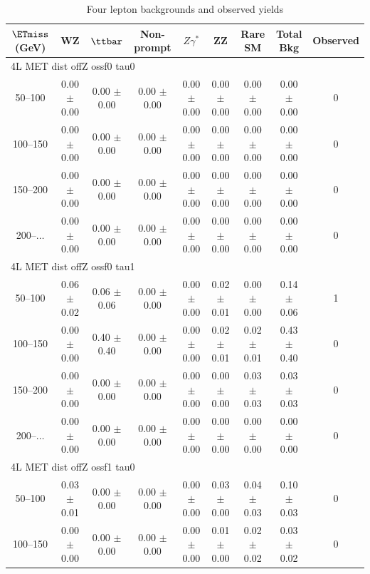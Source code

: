 \newpage
\begin{table}[htp]
\begin{center}
\caption{\label{tab:fourLeptonResults} Four lepton backgrounds and observed yields}
\scriptsize
\begin{tabular}{|c|cccccc|c|c|}\hline\hline
$\ETmiss$ (GeV) & WZ & $\ttbar$ &  Non-prompt & $Z\gamma^{*}$ & ZZ & Rare SM & Total Bkg & Observed \\
\hline\hline
\multicolumn{9}{l}{4L MET dist offZ ossf0 tau0}\\\hline\hline
50--100 & 0.00 $\pm$ 0.00 & 0.00 $\pm$ 0.00 & 0.00 $\pm$ 0.00 & 0.00 $\pm$ 0.00 & 0.00 $\pm$ 0.00 & 0.00 $\pm$ 0.00 & 0.00 $\pm$ 0.00 & 0 \\
100--150 & 0.00 $\pm$ 0.00 & 0.00 $\pm$ 0.00 & 0.00 $\pm$ 0.00 & 0.00 $\pm$ 0.00 & 0.00 $\pm$ 0.00 & 0.00 $\pm$ 0.00 & 0.00 $\pm$ 0.00 & 0 \\
150--200 & 0.00 $\pm$ 0.00 & 0.00 $\pm$ 0.00 & 0.00 $\pm$ 0.00 & 0.00 $\pm$ 0.00 & 0.00 $\pm$ 0.00 & 0.00 $\pm$ 0.00 & 0.00 $\pm$ 0.00 & 0 \\
200--$\dots$ & 0.00 $\pm$ 0.00 & 0.00 $\pm$ 0.00 & 0.00 $\pm$ 0.00 & 0.00 $\pm$ 0.00 & 0.00 $\pm$ 0.00 & 0.00 $\pm$ 0.00 & 0.00 $\pm$ 0.00 & 0 \\
\hline\hline
\multicolumn{9}{l}{4L MET dist offZ ossf0 tau1}\\\hline\hline
50--100 & 0.06 $\pm$ 0.02 & 0.06 $\pm$ 0.06 & 0.00 $\pm$ 0.00 & 0.00 $\pm$ 0.00 & 0.02 $\pm$ 0.01 & 0.00 $\pm$ 0.00 & 0.14 $\pm$ 0.06 & 1 \\
100--150 & 0.00 $\pm$ 0.00 & 0.40 $\pm$ 0.40 & 0.00 $\pm$ 0.00 & 0.00 $\pm$ 0.00 & 0.02 $\pm$ 0.01 & 0.02 $\pm$ 0.01 & 0.43 $\pm$ 0.40 & 0 \\
150--200 & 0.00 $\pm$ 0.00 & 0.00 $\pm$ 0.00 & 0.00 $\pm$ 0.00 & 0.00 $\pm$ 0.00 & 0.00 $\pm$ 0.00 & 0.03 $\pm$ 0.03 & 0.03 $\pm$ 0.03 & 0 \\
200--$\dots$ & 0.00 $\pm$ 0.00 & 0.00 $\pm$ 0.00 & 0.00 $\pm$ 0.00 & 0.00 $\pm$ 0.00 & 0.00 $\pm$ 0.00 & 0.00 $\pm$ 0.00 & 0.00 $\pm$ 0.00 & 0 \\
\hline\hline
\multicolumn{9}{l}{4L MET dist offZ ossf1 tau0}\\\hline\hline
50--100 & 0.03 $\pm$ 0.01 & 0.00 $\pm$ 0.00 & 0.00 $\pm$ 0.00 & 0.00 $\pm$ 0.00 & 0.03 $\pm$ 0.00 & 0.04 $\pm$ 0.03 & 0.10 $\pm$ 0.03 & 0 \\
100--150 & 0.00 $\pm$ 0.00 & 0.00 $\pm$ 0.00 & 0.00 $\pm$ 0.00 & 0.00 $\pm$ 0.00 & 0.01 $\pm$ 0.00 & 0.02 $\pm$ 0.02 & 0.03 $\pm$ 0.02 & 0 \\

\end{tabular}
\end{center}
\end{table}
